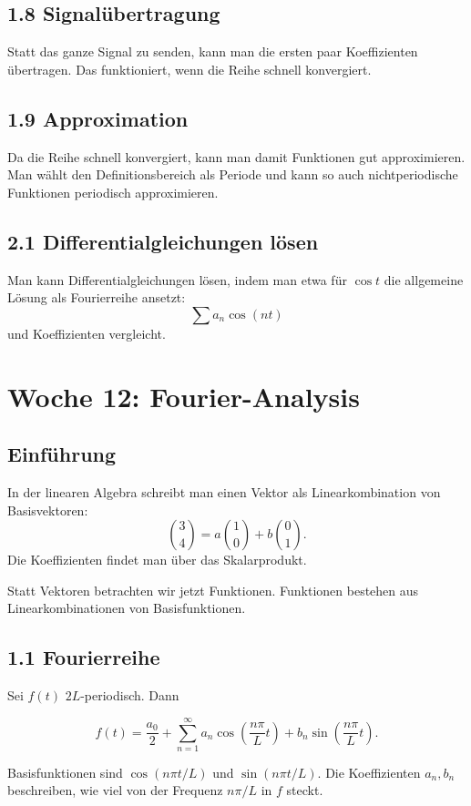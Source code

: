 \documentclass[11pt,a4paper]{article}
\begin{document}
\subsection{1.8 Signalübertragung}
Statt das ganze Signal zu senden, kann man die ersten paar Koeffizienten übertragen. Das funktioniert, wenn die Reihe schnell konvergiert.

\subsection{1.9 Approximation}
Da die Reihe schnell konvergiert, kann man damit Funktionen gut approximieren. Man wählt den Definitionsbereich als Periode und kann so auch nichtperiodische Funktionen periodisch approximieren.

\subsection{2.1 Differentialgleichungen lösen}
Man kann Differentialgleichungen lösen, indem man etwa für $\cos t$ die allgemeine Lösung als Fourierreihe ansetzt:
\[
\sum a_n\cos(nt)
\]
und Koeffizienten vergleicht.

\section{Woche 12: Fourier-Analysis}

\subsection{Einführung}
In der linearen Algebra schreibt man einen Vektor als Linearkombination von Basisvektoren:
\[
\binom34=a\binom10+b\binom01.
\]
Die Koeffizienten findet man über das Skalarprodukt.

Statt Vektoren betrachten wir jetzt Funktionen. Funktionen bestehen aus Linearkombinationen von Basisfunktionen.

\subsection{1.1 Fourierreihe}
Sei $f(t)$ $2L$-periodisch. Dann
\begin{importantbox}
\[
f(t)=\frac{a_0}{2}+\sum_{n=1}^{\infty}a_n\cos\left(\frac{n\pi}{L}t\right)+b_n\sin\left(\frac{n\pi}{L}t\right).
\]
\end{importantbox}
Basisfunktionen sind $\cos(n\pi t/L)$ und $\sin(n\pi t/L)$. Die Koeffizienten $a_n,b_n$ beschreiben, wie viel von der Frequenz $n\pi/L$ in $f$ steckt.
\end{document}
